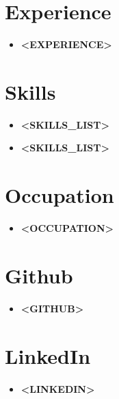 \documentclass[lighthipster]{simplehipstercv}
\begin{document}
\begin{paracol}{2}
        \section*{Experience}
        \begin{itemize}
            \item \textbf{<EXPERIENCE>}
        \end{itemize}

        \section*{Skills}
        \begin{itemize}
            \item \textbf{<SKILLS_LIST>}
            \item \textbf{<SKILLS_LIST>}
        \end{itemize}

        \vspace{3em}

        \section*{Occupation}
        \begin{itemize}
            \item \textbf{<OCCUPATION>}
        \end{itemize}

        \section*{Github}
        \begin{itemize}
            \item \textbf{<GITHUB>}
        \end{itemize}

        \section*{LinkedIn}
        \begin{itemize}
            \item \textbf{<LINKEDIN>}
        \end{itemize}

        \vfill{}
    \end{paracol}
\end{document}
